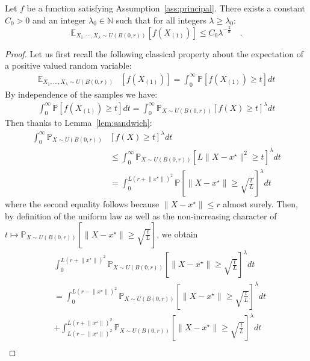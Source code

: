 \begin{lemma}\label{lem:upper1best}
Let $f$ be a function satisfying Assumption~\ref{ass:principal}. There exists a constant $C_0>0$ and an integer $\lambda_0\in \mathbb{N}$ such that for all integers $ \lambda\geq \lambda_0$:
$$\mathbb{E}_{X_1,\cdots,X_\lambda\sim U(B(0,r))}\left[ f\left(X_{(1)}\right)\right] \leq C_0 \lambda^{-\frac2d}\quad. $$
\end{lemma}
\begin{proof}
Let us first recall the following classical property about the expectation of a positive valued random variable:    
\begin{align*}
\mathbb{E}_{X_1,\dots,X_\lambda\sim U(B(0,r))}&\left[ f\left(X_{(1)}\right)\right]= \int_0^\infty \mathbb{P}\left[ f\left(X_{(1)}\right)\geq t\right] dt
\end{align*}
By independence of the samples we have:  
\begin{align*}
\int_0^\infty \mathbb{P}\left[ f\left(X_{(1)}\right)\geq t\right] dt= \int_0^\infty \mathbb{P}_{X\sim U(B(0,r))}\left[ f\left(X\right)\geq t\right]^\lambda dt
\end{align*}
Then thanks to Lemma~\ref{lem:sandwich}:
\begin{align*}
     \int_0^\infty \mathbb{P}_{X\sim U(B(0,r))}&\left[ f\left(X\right)\geq t\right]^\lambda dt\\
 &\leq \int_0^\infty \mathbb{P}_{X\sim U(B(0,r))}\left[ L\lVert X-x^\star\rVert^2 \geq t\right]^\lambda dt\\
  &= \int_0^{L\left(r+\lVert x^\star\rVert\right)^2} \mathbb{P}\left[ \lVert X-x^\star\rVert \geq \sqrt{\frac{t}{L}}\right]^\lambda dt
\end{align*}
where the second equality follows because $\lVert X-x^{\star} \rVert \leq r$ almost surely.
Then, by definition of the uniform law as well as the non-increasing character of $t\mapsto \mathbb{P}_{X\sim U(B(0,r))}\left[ \lVert X-x^\star\rVert \geq \sqrt{\frac{t}{L}}\right]$, we obtain
\begin{align*}
  &\int_0^{L\left(r+\lVert x^\star\rVert\right)^2} \mathbb{P}_{X\sim U(B(0,r))}\left[ \lVert X-x^\star\rVert \geq \sqrt{\frac{t}{L}}\right]^\lambda dt \\
&=\int_0^{L\left(r-\lVert x^\star\rVert\right)^2} \mathbb{P}_{X\sim U(B(0,r))}\left[ \lVert X-x^\star\rVert \geq \sqrt{\frac{t}{L}}\right]^\lambda dt \\
&+ \int_{L\left(r-\lVert x^\star\rVert\right)^2}^{L\left(r+\lVert x^\star\rVert\right)^2} \mathbb{P}_{X\sim U(B(0,r))}\left[ \lVert X-x^\star\rVert \geq \sqrt{\frac{t}{L}}\right]^\lambda dt\\

\end{align*}
\end{proof}
